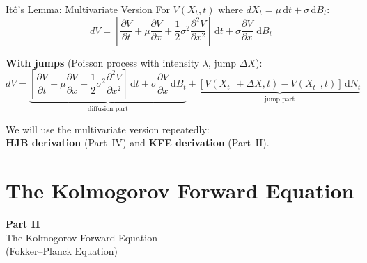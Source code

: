 \documentclass[aspectratio=169,11pt]{beamer}
\newcommand{\ud}{\,\mathrm{d}}
\begin{document}
\begin{frame}{It\^o's Lemma: Multivariate Version}
\small
For $V(X_t, t)$ where $dX_t = \mu\ud t + \sigma\ud B_t$:
\[
\boxed{dV = \left[\frac{\partial V}{\partial t} + \mu\frac{\partial V}{\partial x} + \frac{1}{2}\sigma^2 \frac{\partial^2 V}{\partial x^2}\right]\ud t + \sigma\frac{\partial V}{\partial x}\,\ud B_t}
\]

\vspace{0.2em}
\textbf{With jumps} (Poisson process with intensity $\lambda$, jump $\Delta X$):
\[
dV = \underbrace{\left[\frac{\partial V}{\partial t} + \mu\frac{\partial V}{\partial x} + \frac{1}{2}\sigma^2 \frac{\partial^2 V}{\partial x^2}\right]\ud t + \sigma\frac{\partial V}{\partial x}\ud B_t}_{\text{diffusion part}} + \underbrace{\left[V(X_{t^-}+\Delta X, t) - V(X_{t^-}, t)\right]\ud N_t}_{\text{jump part}}
\]

\vspace{0.2em}
\begin{center}
\colorbox{uzhgreylight}{\parbox{0.8\textwidth}{\centering\small
We will use the multivariate version repeatedly:\\
\textbf{HJB derivation} (Part~IV) and \textbf{KFE derivation} (Part~II).}}
\end{center}
\end{frame}


\section{The Kolmogorov Forward Equation}

\begin{frame}{}
\vfill
\begin{center}
{\Huge \textcolor{uzhblue}{\textbf{Part II}}}\\[12pt]
{\LARGE The Kolmogorov Forward Equation}\\[6pt]
{\large (Fokker--Planck Equation)}
\end{center}
\vfill
\end{frame}
\end{document}
